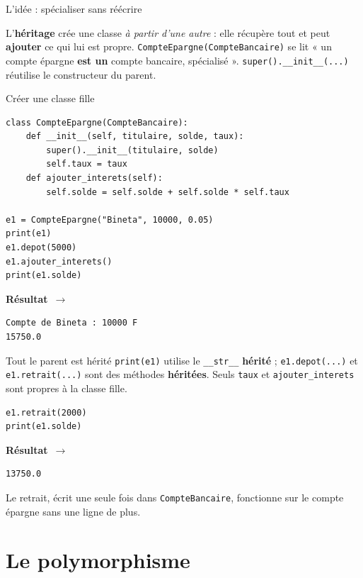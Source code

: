 \documentclass[aspectratio=169,11pt]{beamer}
\newcommand{\resultat}{{\scriptsize\textbf{R\'esultat}~$\rightarrow$}\par\vspace{1pt}}
\begin{document}
\begin{frame}{L'idée : spécialiser sans réécrire}
\begin{ucaddef}
{\small L'\textbf{héritage} crée une classe \emph{à partir d'une autre} : elle récupère tout et peut \textbf{ajouter} ce qui lui est propre. \texttt{CompteEpargne(CompteBancaire)} se lit « un compte épargne \textbf{est un} compte bancaire, spécialisé ». \texttt{super().\_\_init\_\_(...)} réutilise le constructeur du parent.}
\end{ucaddef}
\end{frame}

\begin{frame}[fragile]{Créer une classe fille}
\begin{lstlisting}
class CompteEpargne(CompteBancaire):
    def __init__(self, titulaire, solde, taux):
        super().__init__(titulaire, solde)
        self.taux = taux
    def ajouter_interets(self):
        self.solde = self.solde + self.solde * self.taux

e1 = CompteEpargne("Bineta", 10000, 0.05)
print(e1)
e1.depot(5000)
e1.ajouter_interets()
print(e1.solde)
\end{lstlisting}
\resultat
\begin{lstlisting}[style=out]
Compte de Bineta : 10000 F
15750.0
\end{lstlisting}
\end{frame}

\begin{frame}[fragile]{Tout le parent est hérité}
{\small \texttt{print(e1)} utilise le \texttt{\_\_str\_\_} \textbf{hérité} ; \texttt{e1.depot(...)} et \texttt{e1.retrait(...)} sont des méthodes \textbf{héritées}. Seuls \texttt{taux} et \texttt{ajouter\_interets} sont propres à la classe fille.}
\begin{lstlisting}
e1.retrait(2000)
print(e1.solde)
\end{lstlisting}
\resultat
\begin{lstlisting}[style=out]
13750.0
\end{lstlisting}
{\small Le retrait, écrit une seule fois dans \texttt{CompteBancaire}, fonctionne sur le compte épargne sans une ligne de plus.}
\end{frame}

\section{Le polymorphisme}
\end{document}
